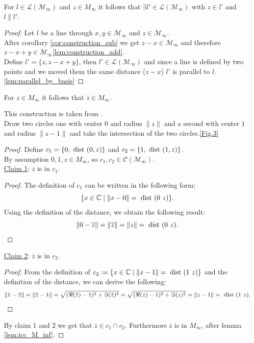 \begin{corollary}
    \label{lem:construction_parallel_lines}
    \leanok
    For $l \in \mathcal{L(M_{\infty})}$ and $z \in M_{\infty}$ it follows that $\exists l' \in \mathcal{L(M_{\infty})}$ with  $z\in l'$  and  $l\|l'$.
\end{corollary}
\begin{proof}
    \leanok
    Let $l$ be a line through $x,y \in \mathcal{M_{\infty}}$ and $z \in \mathcal{M_{\infty}}$.\\
    After corollary \ref{cor:construction_sub} we get $z - x \in \mathcal{M_{\infty}}$ and therefore $z-x + y \in \mathcal{M_{\infty}}$\ref{lem:construction_add}.\\
    Define $l' = \{z, z-x+y\}$, then $l' \in \mathcal{L(M_{\infty})}$ and since a line is defined by two points and we moved them the same distance ($z-x$) $l'$ is parallel to $l$.\ref{lem:parallel_by_basis}
\end{proof}
\begin{lemma}
    \label{lem:construction_conj}
    \leanok
    For $z \in M_{\infty}$ it follows that $\overline{z} \in M_{\infty}$.
\end{lemma}
This construction is taken from \cite{JAN_SCHRÖER:2023}.\\
Draw two circles one with center $0$ and radius $\|z\|$ and a second with center $1$ and radius $\|z-1\|$ and take the intersection of the two circles.\ref{Fig.3}
\begin{proof}
    \leanok
    Define $c_1 = \{0,\text{ dist } (0, z)\}$ and $c_2 = \{1,\text{ dist } (1, z)\}$.\\
    By assumption $0, 1, z \in M_{\infty}$, so $c_1, c_2 \in \mathcal{C(M_{\infty})}$.\\
    \underline{Claim 1}: $\overline{z}$ is in $c_1$.
    \begin{proof}
        The definition of $c_1$ can be written in the following form: $$\{x\in\mathbb{C} \mid \|x-0\| = \dist (0\ z)\}.$$ 
        Using the definition of the distance, we obtain the following result: $$\|0 - \overline{z}\| = \|\overline{z}\| = \|z\| = \text{ dist } (0\ z).$$
    \end{proof}
    \underline{Claim 2}: $\overline{z}$ is in $c_2$.
    \begin{proof}
        From the definition of $c_2:=\{x\in\mathbb{C} \mid\|x-1\|=\dist (1\ z)\}$ and the definition of the distance, we can derive the following:
         $$\|1-\overline{z}\| = \|\overline{z}-1\| = \sqrt{(\Re(\overline{z})-1)^2 + \Im(\overline{z})^2} = \sqrt{(\Re(z)-1)^2 + \Im(z)^2} = \|z-1\|=\text{ dist } (1\ z).$$
    \end{proof}
    By claim 1 and 2 we get that $\overline{z} \in c_1 \cap c_2$. Furthermore  $\overline{z} $ is in $M_{\infty}$, after lemma \ref{lem:icc_M_inf}.
\end{proof}

